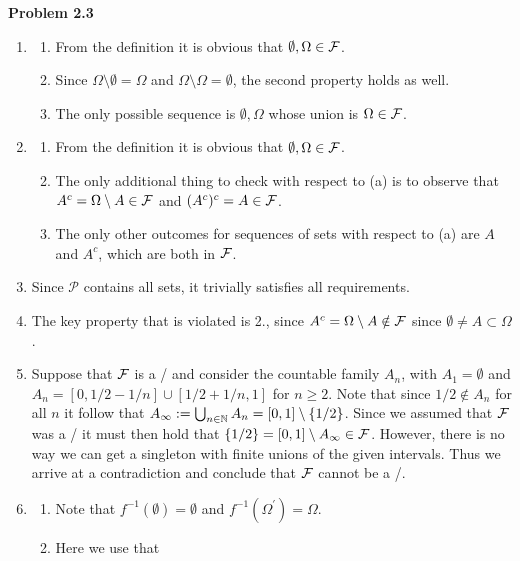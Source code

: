 
\textbf{Problem 2.3}

\begin{enumerate}[label=(\alph*)]
\item 
\begin{enumerate}[label=\arabic*.]
\item From the definition it is obvious that $\emptyset, \Omega \in \mathcal F$.
\item Since $\Omega \setminus \emptyset = \Omega$ and $\Omega \setminus \Omega = \emptyset$, the second property holds as well.
\item The only possible sequence is $\emptyset, \Omega$ whose union is $\Omega \in \mathcal F$.
\end{enumerate}
\item 
\begin{enumerate}[label=\arabic*.]
\item From the definition it is obvious that $\emptyset, \Omega \in \mathcal F$.
\item The only additional thing to check with respect to (a) is to observe that $A^c = \Omega \setminus A \in \mathcal F$ and $(A^c)^c = A \in \mathcal F$.
\item The only other outcomes for sequences of sets with respect to (a) are $A$ and $A^c$, which are both in $\mathcal F$.
\end{enumerate}
\item Since $\mathcal{P}$ contains all sets, it trivially satisfies all requirements.
\item The key property that is violated is 2., since $A^c = \Omega \setminus A \notin \mathcal F$ since $\emptyset \ne A \subset \Omega$.
\item Suppose that $\mathcal F$ is a \sigalg/ and consider the countable family $A_n$, with $A_1 = \emptyset$ and $A_n = [0,1/2 - 1/n] \cup  [1/2 + 1/n, 1]$ for $n \ge 2$. Note that since $1/2 \notin A_n$ for all $n$ it follow that $A_\infty := \bigcup_{n \in \mathbb N} A_n = [0,1] \setminus \{1/2\}$. Since we assumed that $\mathcal F$ was a \sigalg/ it must then hold that $\{1/2\} = [0,1] \setminus A_\infty \in \mathcal F$. However, there is no way we can get a singleton with finite unions of the given intervals. Thus we arrive at a contradiction and conclude that $\mathcal F$ cannot be a \sigalg/.
\item 
\begin{enumerate}[label=\arabic*.]
\item Note that $f^{-1}(\emptyset) = \emptyset$ and $f^{-1}(\Omega^\prime) = \Omega$.
\item Here we use that
\begin{align*}

\end{align*}
\end{enumerate}
\end{enumerate}
